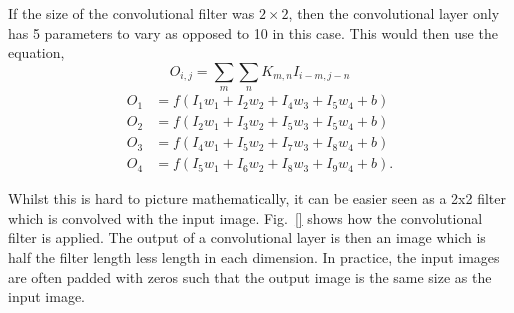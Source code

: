 If the size of the convolutional filter was $2\times 2$, then the convolutional layer only has 5 parameters to vary as opposed to 10 in this case.
This would then use the equation,
\begin{equation}
    O_{i,j} = \sum_{m} \sum_{n} K_{m,n}I_{i-m,j-n}
\end{equation}
\begin{equation}
\begin{split}
    O_1 &= f\left(I_1 w_1 + I_2 w_2 + I_4 w_3 + I_5 w_4 + b\right) \\
    O_2 &=  f\left( I_2 w_1 + I_3 w_2 + I_5 w_3 + I_5 w_4 + b\right)\\
    O_3 &=  f\left(I_4 w_1 + I_5 w_2 + I_7 w_3 + I_8 w_4 + b\right)\\
    O_4 &=  f\left(I_5 w_1 + I_6 w_2 + I_8 w_3 + I_9 w_4 + b\right).
\end{split}
\end{equation}

Whilst this is hard to picture mathematically, it can be easier seen as a 2x2 filter which is convolved with the input image. 
Fig.~\ref{} shows how the convolutional filter is applied.
The output of a convolutional layer is then an image which is half the filter length less length in each dimension. 
In practice, the input images are often padded with zeros such that the output image is the same size as the input image. 

